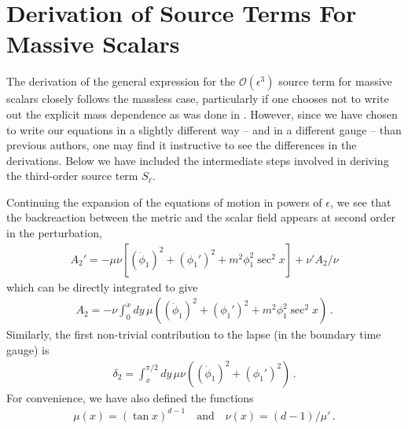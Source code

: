 \documentclass[letterpaper,11pt]{article}
\newcommand{\mc}{\mathcal}
\begin{document}
\section{Derivation of Source Terms For Massive Scalars}
\label{app: source term derivation}

The derivation of the general expression for the $\mc{O}(\epsilon^3)$ source term for massive scalars closely follows the massless case, particularly if one chooses not to write out the explicit mass dependence as was done in \cite{1810.04753}. However, since we have chosen to write our equations in a slightly different way -- and in a different gauge -- than previous authors, one may find it instructive to see the differences in the derivations. Below we have included the intermediate steps involved in deriving the third-order source term $S_\ell$.

Continuing the expansion of the equations of motion in powers of $\epsilon$, we see that the backreaction between the metric and the scalar field appears at second order in the perturbation,
\begin{align}
A_2' = - \mu \nu \left[ (\dot \phi_1 )^2 + (\phi_1')^2 + m^2 \phi_1^2 \sec^2 x \right] + \nu' A_2 / \nu
\end{align}
which can be directly integrated to give
\begin{align}
A_2 = -\nu \int^x_0 dy \, \mu \left( (\dot \phi_1 )^2 + (\phi_1')^2 + m^2 \phi_1^2 \sec^2 x \right) \, .
\end{align}
Similarly, the first non-trivial contribution to the lapse (in the boundary time gauge) is
\begin{align}
\delta_2 = \int^{\pi/2}_x dy \, \mu \nu \left(  (\dot \phi_1 )^2 + (\phi_1')^2 \right) \, .
\end{align}
For convenience, we have also defined the functions
\begin{align}
\mu (x) = \left( \tan x \right)^{d-1} \quad \text{and} \quad \nu(x) = (d-1) / \mu ' \, .
\end{align}
\end{document}
